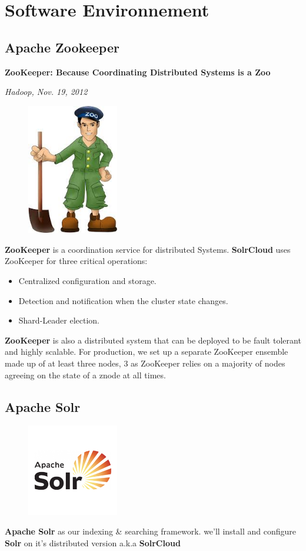 \clearpage

\section{Software Environnement}
\subsection{Apache Zookeeper}
\epigraph{\textbf{ZooKeeper: Because Coordinating Distributed Systems is a Zoo}}{\textit{Hadoop, Nov. 19, 2012}}

\begin{figure}
    \includegraphics[width=4cm]{images/zookeeper.jpeg}
\end{figure}
\textbf{ZooKeeper} is a coordination service for distributed Systems. \textbf{SolrCloud} uses ZooKeeper for three 
critical operations:
\begin{itemize}
    \item Centralized configuration and storage.
    \item Detection and notification when the cluster state changes.
    \item Shard-Leader election. 
\end{itemize}  
\textbf{ZooKeeper} is also a distributed system that can be deployed to be fault tolerant and highly
scalable. For production, we set up a separate ZooKeeper ensemble made up of at
least three nodes, 3 as ZooKeeper relies on a majority of nodes agreeing on the state of a znode at all times.
\bigbreak
\bigbreak
\bigbreak
\bigbreak
\bigbreak
\bigbreak

\subsection{Apache Solr}
\begin{figure}
    \includegraphics[width=4cm]{images/solr.png}
\end{figure}
\textbf{Apache Solr} as our indexing \& searching framework. we'll install and configure \textbf{Solr} on it's distributed version a.k.a \textbf{SolrCloud}
\bigbreak
\bigbreak
\bigbreak
\bigbreak
\bigbreak
\bigbreak
\bigbreak
\bigbreak
\bigbreak

